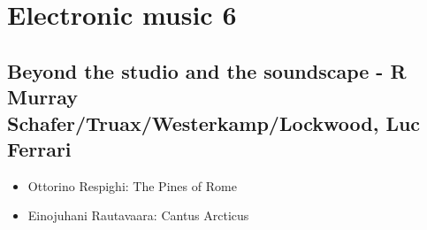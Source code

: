 
\chapter{Electronic music 6}
\label{history6}

\section{Beyond the studio and the soundscape - R Murray Schafer/Truax/Westerkamp/Lockwood, Luc Ferrari}

\begin{itemize}
\item Ottorino Respighi: The Pines of Rome 
\item Einojuhani Rautavaara: Cantus Arcticus
\end{itemize}
